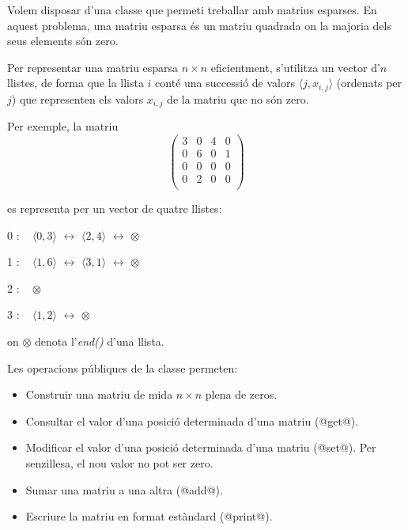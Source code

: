 
\Statement

Volem disposar d'una classe que permeti treballar amb matrius esparses. En
aquest problema, una matriu esparsa és un matriu quadrada on la majoria dels
seus elements són zero.

\medskip

Per representar una matriu esparsa $n\times n$
eficientment, s'utilitza un vector d'$n$ llistes, de forma que la llista
$i$ conté una successió de valors $\langle j,x_{i,j}\rangle$ (ordenats per $j$) que representen
els valors $x_{i,j}$ de la matriu que no són zero.

\medskip

Per exemple, la matriu
\[
    \left(
        \begin{array}{cccc}
            3 & 0 & 4 & 0 \\
            0 & 6 & 0 & 1 \\
            0 & 0 & 0 & 0 \\
            0 & 2 & 0 & 0 \\
        \end{array}
    \right)
\]
\smallskip

es representa per un vector de quatre llistes:

\bigskip

\hspace*{5.5cm} 0 : ~ $\langle0,3\rangle$ $\longleftrightarrow$ $\langle2,4\rangle$ $\longleftrightarrow$ $\otimes$

\smallskip

\hspace*{5.5cm} 1 : ~ $\langle1,6\rangle$ $\longleftrightarrow$ $\langle3,1\rangle$ $\longleftrightarrow$ $\otimes$

\smallskip

\hspace*{5.5cm} 2 : ~ $\otimes$

\smallskip

\hspace*{5.5cm} 3 : ~ $\langle1,2\rangle$ $\longleftrightarrow$ $\otimes$

\bigskip

on  $\otimes$ denota l'\emph{end()} d'una llista.


\bigskip

Les operacions públiques de la classe permeten:

\begin{itemize}
    \item Construir una matriu de mida $n\times n$ plena de zeros.
    \item Consultar el valor d'una posició determinada d'una matriu (@get@).
    \item Modificar el valor d'una posició determinada d'una matriu (@set@).
    Per senzillesa, el nou valor no pot ser zero.
    \item Sumar una matriu a una altra (@add@).
    \item Escriure la matriu en format estàndard (@print@).
\end{itemize}

